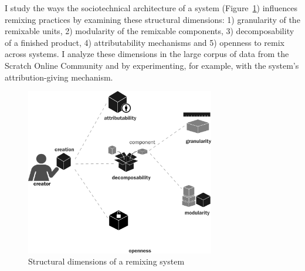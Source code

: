 I study the ways the sociotechnical architecture of a system (Figure~\ref{fig:structure}) influences remixing practices by examining these structural dimensions:
1) granularity of the remixable units, 
2) modularity of the remixable components, 
3) decomposability of a finished product, 
4) attributability mechanisms and 
5) openness to remix across systems. 
I analyze these dimensions in the large corpus of data from the Scratch Online Community and by experimenting, for example, with the system's attribution-giving mechanism.

\begin{figure}
\centering
\includegraphics[width=3.25in]{figures/structure.pdf}
\caption{Structural dimensions of a remixing system}
\label{fig:structure}
\end{figure}


%
%

